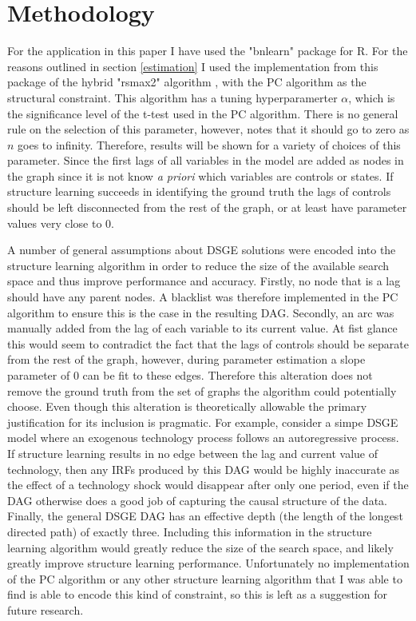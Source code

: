 \documentclass{article}
\begin{document}
\section{Methodology}

For the application in this paper I have used the "bnlearn" package \parencite{scutari2010bnlearn} for R. For the reasons outlined in section \ref{estimation} I used the implementation from this package of the hybrid "rsmax2" algorithm \parencite{spirtes2000causation}, with the PC algorithm as the structural constraint. This algorithm has a tuning hyperparamerter $\alpha$, which is the significance level of the t-test used in the PC algorithm. There is no general rule on the selection of this parameter, however, \citeauthor{kalisch2007estimating} notes that it should go to zero as $n$ goes to infinity. Therefore, results will be shown for a variety of choices of this parameter. Since the first lags of all variables in the model are added as nodes in the graph since it is not know \textit{a priori} which variables are controls or states. If structure learning succeeds in identifying the ground truth the lags of controls should be left disconnected from the rest of the graph, or at least have parameter values very close to 0. 

A number of general assumptions about DSGE solutions were encoded into the structure learning algorithm in order to reduce the size of the available search space and thus improve performance and accuracy. Firstly, no node that is a lag should have any parent nodes. A blacklist was therefore implemented in the PC algorithm to ensure this is the case in the resulting DAG. Secondly, an arc was manually added from the lag of each variable to its current value. At fist glance this would seem to contradict the fact that the lags of controls should be separate from the rest of the graph, however, during parameter estimation a slope parameter of 0 can be fit to these edges. Therefore this alteration does not remove the ground truth from the set of graphs the algorithm could potentially choose. Even though this alteration is theoretically allowable the primary justification for its inclusion is pragmatic. For example, consider a simpe DSGE model where an exogenous technology process follows an autoregressive process. If structure learning results in no edge between the lag and current value of technology, then any IRFs produced by this DAG would be highly inaccurate as the effect of a technology shock would disappear after only one period, even if the DAG otherwise does a good job of capturing the causal structure of the data.
Finally, the general DSGE DAG has an effective depth (the length of the longest directed path) of exactly three. Including this information in the structure learning algorithm would greatly reduce the size of the search space, and likely greatly improve structure learning performance. Unfortunately no implementation of the PC algorithm or any other structure learning algorithm that I was able to find is able to encode this kind of constraint, so this is left as a suggestion for future research. 
\end{document}

